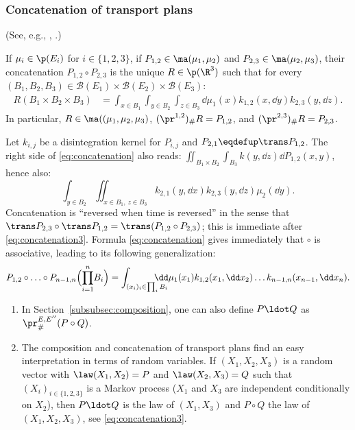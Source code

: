 \subsubsection{Concatenation of transport plans}\label{subsec:caten} (See, e.g., \cite[p.\,111]{Ke72}, \cite[p.\,23]{Vi2}.)
\begin{defi}\label{defi:concatenation}
If $\mu_i\in\p(E_i)$ for $i\in\{1,2,3\}$, if $P_{1,2}\in\ma(\mu_1,\mu_2)$ and $P_{2,3}\in\ma(\mu_2,\mu_3)$, their concatenation $P_{1,2}\circ P_{2,3}$ is the unique $R\in\p(\R^3)$ such that for every $ (B_1,B_2,B_3)\in\mathcal{B}(E_1)\times\mathcal{B}(E_2)\times\mathcal{B}(E_3)$:
\begin{align}\label{eq:concatenation}
R(B_1\times B_2\times B_3)&=\int_{x\in B_1}\int_{y\in B_2}\int_{z\in B_3} \dd\mu_1(x)k_{1,2}(x,\dd y)k_{2,3}(y,\dd z).
\end{align}
In particular, $R\in\ma((\mu_1,\mu_2,\mu_3)$, $(\pr^{1,2})_\#R=P_{1,2}$, and $(\pr^{2,3})_\#R=P_{2,3}$.
\end{defi}

\begin{rem} Let $k_{i,j}$ be a disintegration kernel for $P_{i,j}$ and $P_{2,1}\eqdefup\trans P_{1,2}$. The right side of \eqref{eq:concatenation} also reads: $\iint_{B_1\times B_2} \int_{B_3}k(y,\dd z)\dd P_{1,2}(x,y)$, hence also:
\begin{equation}
\int_{y\in B_2} \iint_{x\in B_1,\,z\in B_3}k_{2,1}(y,\dd x)k_{2,3}(y,\dd z)\mu_2(\dd y).\label{eq:concatenation3}
\end{equation}
Concatenation is ``reversed when time is reversed'' in the sense that $\trans P_{2,3}\circ{}\trans P_{1,2}=\trans(P_{1,2}\circ P_{2,3})$; this is immediate after \eqref{eq:concatenation3}. Formula \eqref{eq:concatenation} gives immediately that $\circ$ is associative, leading to its following generalization:
\[P_{1,2}\circ\ldots\circ P_{n-1,n}\Bigl({\prod_{i=1}^n}B_i\Bigr)=\int_{(x_i)_i\in \prod_iB_i}
\hspace{-4ex}\dd\mu_1(x_1)k_{1,2}(x_1,\dd x_2)\ldots k_{n-1,n}(x_{n-1},\dd x_n).\]
\end{rem}

\skpt
\begin{rem}
\begin{enumerate}
\item
In Section~\ref{subsubsec:composition}, one can also define $P\ldot Q$ as $\pr^{E,E''}_\#(P\circ Q)$.

\item
The composition and concatenation of transport plans find an easy interpretation in terms of random variables. If $(X_1,X_2,X_3)$ is a random vector with $\law(X_1,X_2)=P$ and $\law(X_2,X_3)=Q$ such that $(X_i)_{i\in\{1,2,3\}}$ is a Markov process ($X_1$ and $X_3$ are independent conditionally on $X_2$), then $P\ldot Q$ is the law of $(X_1,X_3)$ and $P\circ Q$ the law of $(X_1,X_2,X_3)$, see \eqref{eq:concatenation3}.
\end{enumerate}
\end{rem}

